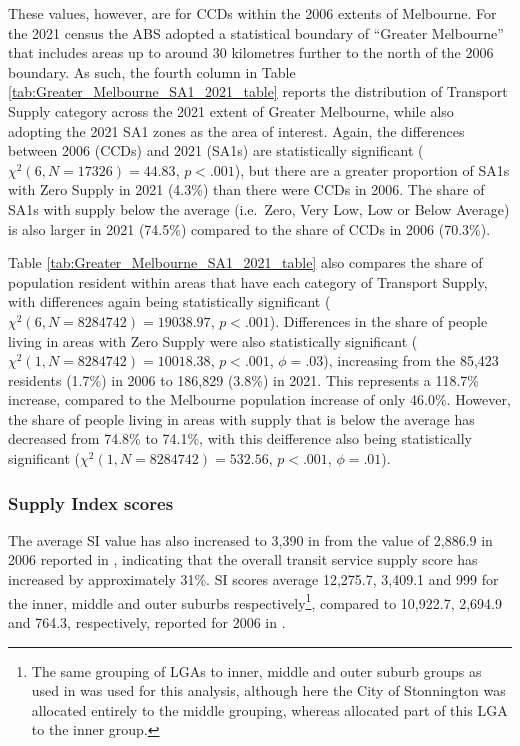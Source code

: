 \documentclass[preprint, 3p,
authoryear]{elsarticle} %
\begin{document}
These values, however, are for CCDs within the 2006 extents of
Melbourne. For the 2021 census the ABS adopted a statistical boundary of
``Greater Melbourne'' that includes areas up to around 30 kilometres
further to the north of the 2006 boundary. As such, the fourth column in
Table \ref{tab:Greater_Melbourne_SA1_2021_table} reports the
distribution of Transport Supply category across the 2021 extent of
Greater Melbourne, while also adopting the 2021 SA1 zones as the area of
interest. Again, the differences between 2006 (CCDs) and 2021 (SA1s) are
statistically significant (\(\chi^2(6, N = 17326) = 44.83\),
\(p < .001\)), but there are a greater proportion of SA1s with Zero
Supply in 2021 (4.3\%) than there were CCDs in 2006. The share of SA1s
with supply below the average (i.e.~Zero, Very Low, Low or Below
Average) is also larger in 2021 (74.5\%) compared to the share of CCDs
in 2006 (70.3\%).

Table \ref{tab:Greater_Melbourne_SA1_2021_table} also compares the share
of population resident within areas that have each category of Transport
Supply, with differences again being statistically significant
(\(\chi^2(6, N = 8284742) = 19038.97\), \(p < .001\)). Differences in
the share of people living in areas with Zero Supply were also
statistically significant (\(\chi^2(1, N = 8284742) = 10018.38\),
\(p < .001\), \(\phi = .03\)), increasing from the 85,423 residents
(1.7\%) in 2006 to 186,829 (3.8\%) in 2021. This represents a 118.7\%
increase, compared to the Melbourne population increase of only 46.0\%.
However, the share of people living in areas with supply that is below
the average has decreased from 74.8\% to 74.1\%, with this deifference
also being statistically significant
(\(\chi^2(1, N = 8284742) = 532.56\), \(p < .001\), \(\phi = .01\)).

\subsubsection{Supply Index scores}\label{supply-index-scores}

The average SI value has also increased to 3,390 in from the value of
2,886.9 in 2006 reported in \citet{currie2010identifying}, indicating
that the overall transit service supply score has increased by
approximately 31\%. SI scores average 12,275.7, 3,409.1 and 999 for the
inner, middle and outer suburbs respectively\footnote{The same grouping
  of LGAs to inner, middle and outer suburb groups as used in
  \citet{currie2010identifying} was used for this analysis, although
  here the City of Stonnington was allocated entirely to the middle
  grouping, whereas \citet{currie2010identifying} allocated part of this
  LGA to the inner group.}, compared to 10,922.7, 2,694.9 and 764.3,
respectively, reported for 2006 in \citet{currie2010identifying}.
\end{document}
